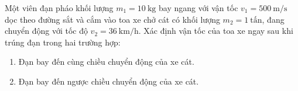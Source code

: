 %		
\begin{ex}
	Một viên đạn pháo khối lượng $m_1=\SI{10}{\kilogram}$ bay ngang với vận tốc $v_1=\SI{500}{\meter/\second}$ dọc theo đường sắt và cắm vào toa xe chở cát có khối lượng $m_2=\SI{1}{\text{tấn}}$, đang chuyển động với tốc độ $v_2=\SI{36}{\kilo\meter/\hour}$. Xác định vận tốc của toa xe ngay sau khi trúng đạn trong hai trường hợp:
	\begin{enumerate}[label=\alph*)]
		\item Đạn bay đến cùng chiều chuyển động của xe cát.
		\item Đạn bay đến ngược chiều chuyển động của xe cát.
	\end{enumerate}
	\loigiai{
		
	}
\end{ex}
%		
